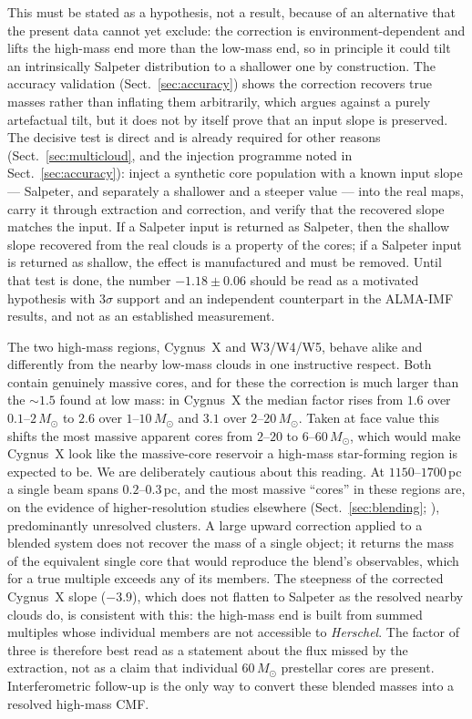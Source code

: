 \documentclass[11pt,a4paper]{article}
\newcommand{\msun}{M_{\odot}}
\begin{document}
This must be stated as a hypothesis, not a result, because of an alternative
that the present data cannot yet exclude: the correction is
environment-dependent and lifts the high-mass end more than the low-mass end,
so in principle it could tilt an intrinsically Salpeter distribution to a
shallower one by construction. The accuracy validation
(Sect.~\ref{sec:accuracy}) shows the correction recovers true masses rather
than inflating them arbitrarily, which argues against a purely artefactual
tilt, but it does not by itself prove that an input slope is preserved. The
decisive test is direct and is already required for other reasons
(Sect.~\ref{sec:multicloud}, and the injection programme noted in
Sect.~\ref{sec:accuracy}): inject a synthetic core population with a known
input slope --- Salpeter, and separately a shallower and a steeper value ---
into the real maps, carry it through extraction and correction, and verify that
the recovered slope matches the input. If a Salpeter input is returned as
Salpeter, then the shallow slope recovered from the real clouds is a property
of the cores; if a Salpeter input is returned as shallow, the effect is
manufactured and must be removed. Until that test is done, the number
$-1.18\pm0.06$ should be read as a motivated hypothesis with $3\sigma$
support and an independent counterpart in the ALMA-IMF results, and not as an
established measurement.

The two high-mass regions, Cygnus~X and W3/W4/W5, behave alike and differently
from the nearby low-mass clouds in one instructive respect. Both contain
genuinely massive cores, and for these the correction is much larger than the
$\sim$$1.5$ found at low mass: in Cygnus~X the median factor rises from $1.6$
over $0.1$--$2\,\msun$ to $2.6$ over $1$--$10\,\msun$ and $3.1$ over
$2$--$20\,\msun$. Taken at face value this shifts the most massive apparent
cores from $2$--$20$ to $6$--$60\,\msun$, which would make Cygnus~X look like
the massive-core reservoir a high-mass star-forming region is expected to be.
We are deliberately cautious about this reading. At $1150$--$1700$\,pc a single
beam spans $0.2$--$0.3$\,pc, and the most massive ``cores'' in these regions
are, on the evidence of higher-resolution studies elsewhere
(Sect.~\ref{sec:blending}; \citealt{Motte+2018}), predominantly unresolved
clusters. A large upward correction applied to a blended system does not
recover the mass of a single object; it returns the mass of the equivalent
single core that would reproduce the blend's observables, which for a true
multiple exceeds any of its members. The steepness of the corrected Cygnus~X
slope ($-3.9$), which does not flatten to Salpeter as the resolved nearby
clouds do, is consistent with this: the high-mass end is built from summed
multiples whose individual members are not accessible to \emph{Herschel}. The
factor of three is therefore best read as a statement about the flux missed by
the extraction, not as a claim that individual $60\,\msun$ prestellar cores are
present. Interferometric follow-up is the only way to convert these blended
masses into a resolved high-mass CMF.
\end{document}

